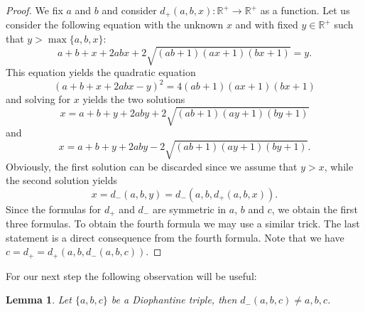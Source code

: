\documentclass{amsart}
\newtheorem{lemma}{Lemma}
\theoremstyle{definition}
\def\RR{\mathbb R}
\begin{document}
\begin{proof}
We fix $a$ and $b$ and consider $d_+(a,b,x):\RR^+\rightarrow \RR^+$ as a function. 
Let us consider the following equation with the unknown $x$ and with fixed $y\in \RR^+$ such that $y>\max\{a,b,x\}$:
$$a+b+x + 2abx +  2\sqrt{(ab+1)(ax+1)(bx+1)}=y.$$
This equation yields the quadratic equation 
$$(a+b+x + 2abx-y)^2=4(ab+1)(ax+1)(bx+1) $$
 and solving for $x$ yields the two solutions
$$x=a+b+y + 2aby + 2\sqrt{(ab+1)(ay+1)(by+1)}$$
and
$$x=a+b+y + 2aby - 2\sqrt{(ab+1)(ay+1)(by+1)}.$$
Obviously, the first solution can be discarded since we assume that $y>x$, while the second solution yields
$$x=d_{-}(a,b,y)=d_{-}(a,b,d_+(a,b,x)).$$
Since the formulas for $d_+$ and $d_-$ are symmetric in $a$, $b$ and $c$, we obtain the first three formulas.
To obtain the fourth formula we may use a similar trick. The last statement is a direct consequence from the fourth 
formula. Note that we have $c=d_+=d_+(a,b,d_-(a,b,c))$.
\end{proof}

For our next step the following observation will be useful:

\begin{lemma}\label{lem:well-def}
 Let $\{a,b,c\}$ be a Diophantine triple, then $d_{-}(a,b,c)\neq a,b,c$.
\end{lemma}
\end{document}
